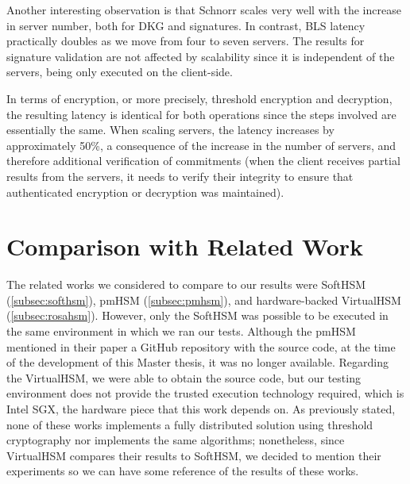 Another interesting observation is that Schnorr scales very well with the increase in server number, both for DKG and signatures. In contrast, BLS latency practically doubles as we move from four to seven servers. The results for signature validation are not affected by scalability since it is independent of the servers, being only executed on the client-side. 

In terms of encryption, or more precisely, threshold encryption and decryption, the resulting latency is identical for both operations since the steps involved are essentially the same. When scaling servers, the latency increases by approximately 50\%, a consequence of the increase in the number of servers, and therefore additional verification of commitments (when the client receives partial results from the servers, it needs to verify their integrity to ensure that authenticated encryption or decryption was maintained).

\section{Comparison with Related Work} \label{sec:eval-comparison-related-work}

The related works we considered to compare to our results were SoftHSM (\ref{subsec:softhsm}), pmHSM (\ref{subsec:pmhsm}), and hardware-backed VirtualHSM (\ref{subsec:rosahsm}). However, only the SoftHSM was possible to be executed in the same environment in which we ran our tests. Although the pmHSM mentioned in their paper a GitHub repository with the source code, at the time of the development of this Master thesis, it was no longer available. Regarding the VirtualHSM, we were able to obtain the source code, but our testing environment does not provide the trusted execution technology required, which is Intel SGX, the hardware piece that this work depends on. As previously stated, none of these works implements a fully distributed solution using threshold cryptography nor implements the same algorithms; nonetheless, since VirtualHSM compares their results to SoftHSM, we decided to mention their experiments so we can have some reference of the results of these works.

